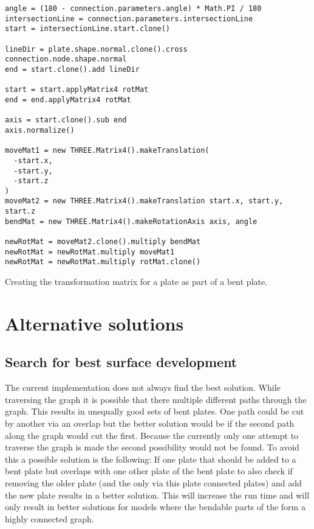 \documentclass[../ClassicThesis.tex]{subfiles}
\begin{document}
\begin{listing}[ht]
\begin{verbatim}
angle = (180 - connection.parameters.angle) * Math.PI / 180
intersectionLine = connection.parameters.intersectionLine
start = intersectionLine.start.clone()

lineDir = plate.shape.normal.clone().cross connection.node.shape.normal
end = start.clone().add lineDir

start = start.applyMatrix4 rotMat
end = end.applyMatrix4 rotMat

axis = start.clone().sub end
axis.normalize()

moveMat1 = new THREE.Matrix4().makeTranslation(
  -start.x,
  -start.y,
  -start.z
)
moveMat2 = new THREE.Matrix4().makeTranslation start.x, start.y, start.z
bendMat = new THREE.Matrix4().makeRotationAxis axis, angle

newRotMat = moveMat2.clone().multiply bendMat
newRotMat = newRotMat.multiply moveMat1
newRotMat = newRotMat.multiply rotMat.clone()
\end{verbatim}
\caption{Creating the transformation matrix for a plate as part of a bent plate.}
\label{lst:bend-matrix}
\end{listing}

\section{Alternative solutions}

\subsection{Search for best surface development}

The current implementation does not always find the best solution. While traversing the graph it is possible that there multiple different paths through the graph. This results in unequally good sets of bent plates. One path could be cut by another via an overlap but the better solution would be if the second path along the graph would cut the first. Because the currently only one attempt to traverse the graph is made the second possibility would not be found.
To avoid this a possible solution is the following: If one plate that should be added to a bent plate but overlaps with one other plate of the bent plate to also check if removing the older plate (and the only via this plate connected plates) and add the new plate results in a better solution.
This will increase the run time and will only result in better solutions for models where the bendable parts of the \threedmodel{} form a highly connected graph.
\end{document}
